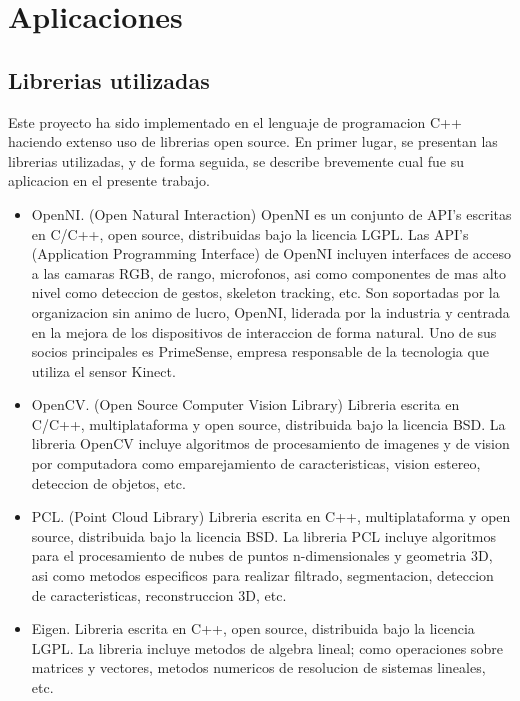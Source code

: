 
\chapter{Aplicaciones}

\section{Librerias utilizadas}

Este proyecto ha sido implementado en el lenguaje de programacion C++ haciendo extenso uso de librerias open source. En primer lugar, se presentan las librerias utilizadas, y de forma seguida, se describe brevemente cual fue su aplicacion en el presente trabajo.

\begin{itemize}

\item OpenNI. (Open Natural Interaction) OpenNI es un conjunto de API’s escritas en C/C++, open source, distribuidas bajo la licencia LGPL. Las API's (Application Programming Interface) de OpenNI incluyen interfaces de acceso a las camaras RGB, de rango, microfonos, asi como componentes de mas alto nivel como deteccion de gestos, skeleton tracking, etc.
Son soportadas por la organizacion sin animo de lucro, OpenNI, liderada por la industria y centrada en la mejora de los dispositivos de interaccion de forma natural. Uno de sus socios principales es PrimeSense, empresa responsable de la tecnologia que utiliza el sensor Kinect. 

\item OpenCV. (Open Source Computer Vision Library) Libreria escrita en C/C++, multiplataforma y open source, distribuida bajo la licencia BSD. La libreria OpenCV incluye algoritmos de procesamiento de imagenes y de vision por computadora como emparejamiento de caracteristicas, vision estereo, deteccion de objetos, etc.

\item PCL. (Point Cloud Library) Libreria escrita en C++, multiplataforma y open source, distribuida bajo la licencia BSD. La libreria PCL incluye algoritmos para el procesamiento de nubes de puntos n-dimensionales y geometria 3D, asi como metodos especificos para realizar filtrado, segmentacion, deteccion de caracteristicas, reconstruccion 3D, etc.

\item Eigen. Libreria escrita en C++, open source, distribuida bajo la licencia LGPL. La libreria incluye metodos de algebra lineal; como operaciones sobre matrices y vectores, metodos numericos de resolucion de sistemas lineales, etc.


\end{itemize}
